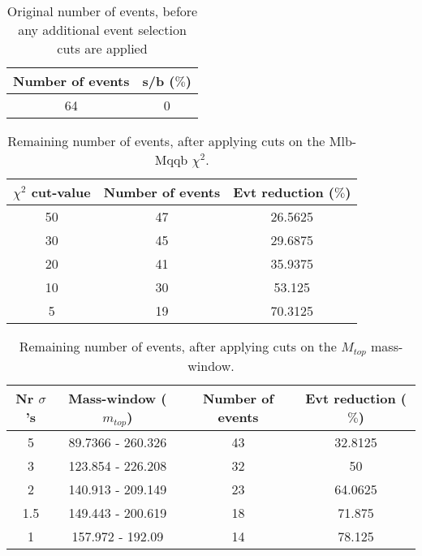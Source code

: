 \documentclass{article}
\begin{document}
 

 \begin{abstract} 
 
   The tables in this document represent the influence of the additional event selection cuts that were applied in order to reduce the number of selected events for CPU reasons. \\ 
   The considered cuts are rather basic and are merely developed to reduce the number of so-called wrong events \\ 
   \begin{itemize} 
     \item Cut on Mlb-Mqqb $\chi^{2}$ distribution 
     \item Cut on top and W-mass window 
   \end{itemize} 
 
   \textbf{Created on :} \today 
 \end{abstract} 
 
 \begin{table}[h!t] 
  \caption{Original number of events, before any additional event selection cuts are applied} 
  \centering 
   \begin{tabular}{c|c} 
     Number of events    & s/b ($\%$)     \\ 
     \hline
     64  & 0 
 
   \end{tabular} 
 \end{table} 
 
 \begin{table}[h!t] 
  \caption{Remaining number of events, after applying cuts on the Mlb-Mqqb $\chi^{2}$.} 
  \centering 
   \begin{tabular}{c|c|c|} 
     $\chi^{2}$ cut-value    & Number of events  & Evt reduction ($\%$)    \\ 
     \hline
     50  &   47  &  26.5625 \\ 
     30  &   45  &  29.6875 \\ 
     20  &   41  &  35.9375 \\ 
     10  &   30  &  53.125 \\ 
     5  &   19  &  70.3125 \\ 
   \end{tabular} 
 \end{table} 
 
 \begin{table}[h!t] 
  \caption{Remaining number of events, after applying cuts on the $M_{top}$ mass-window.} 
  \centering 
   \begin{tabular}{c|c|c|c|}
     Nr $\sigma$'s & Mass-window ($m_{top}$)   & Number of events   & Evt reduction ($\%$)     \\
     \hline
     5 & 89.7366 - 260.326  &   43 &  32.8125 \\ 
     3 & 123.854 - 226.208  &   32 &  50 \\ 
     2 & 140.913 - 209.149  &   23 &  64.0625 \\ 
     1.5 & 149.443 - 200.619  &   18 &  71.875 \\ 
     1 & 157.972 - 192.09  &   14 &  78.125 \\ 
   \end{tabular} 
 \end{table} 
 
\end{document}
